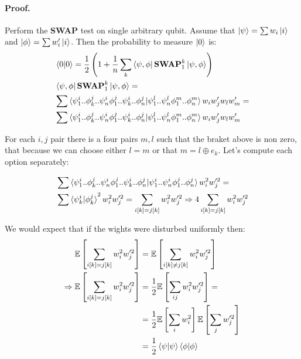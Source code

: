 \documentclass{article}
\begin{document}
\begin{multicols*}{2}
\paragraph{Proof.} Perform the \textbf{SWAP} test on single arbitrary qubit. Assume that \( \ket{\psi} = \sum{w_i \ket{i}} \) and \( \ket{\phi} = \sum{w^{\prime}_i \ket{i}} \). Then the probability to measure \( \ket{0} \) is:
\begin{equation*}
\begin{split}
& \braket{0|0} = \frac{1}{2}\left(1 +  \frac{1}{n}\sum_{k}{ \bra{\psi , \phi}\textbf{SWAP}^{k}_{1} \ket{\psi, \phi}}   \right)  \\ 
& \bra{\psi , \phi}\textbf{SWAP}^{k}_{1} \ket{\psi, \phi} = \\& \sum{\braket{\psi^{i}_{1}..\phi^{j}_{k}..\psi^{i}_{n}\phi^{j}_{1}..\psi^{i}_{k}..\phi^{j}_{n}|\psi^{l}_{1}..\psi^{l}_{n}\phi^{m}_{1}..\phi^{m}_{n}}w_{i}w^{\prime}_{j}w_{l}w^{\prime}_{m}} = \\& \sum{\braket{\psi^{i}_{1}..\phi^{j}_{k}..\psi^{i}_{n}\phi^{j}_{1}..\psi^{i}_{k}..\phi^{j}_{n}|\psi^{l}_{1}..\psi^{l}_{n}\phi^{m}_{1}..\phi^{m}_{n}}w_{i}w^{\prime}_{j}w_{l}w^{\prime}_{m}}
\end{split}    
\end{equation*}

For each \(i,j\) pair there is a four pairs \(m,l\) such that the braket above is non zero, that because we can choose either \( l = m \) or that \(m = l \oplus e_{k} \). Let's compute each option separately:

\begin{equation*}
    \begin{split} 
        & \sum{\braket{\psi^{i}_{1}..\phi^{j}_{k}..\psi^{i}_{n}\phi^{j}_{1}..\psi^{i}_{k}..\phi^{j}_{n}|\psi^{i}_{1}..\psi^{i}_{n}\phi^{j}_{1}..\phi^{j}_{n}}w^{2}_{i}w^{\prime 2 }_{j}} = \\ 
        & \sum{\braket{\psi^{i}_{k}|\phi^{j}_{k}}^2w^{2}_{i}w^{\prime 2 }_{j}} = \sum_{i[k]=j[k]}{w^{2}_{i}w^{\prime 2 }_{j}} \Rightarrow 4 \sum_{i[k]=j[k]}{w^{2}_{i}w^{\prime 2 }_{j}} 
    \end{split}
\end{equation*}

We would expect that if the wights were disturbed uniformly then: 
\begin{equation*}
    \begin{split}
        \mathbb{E}\left[\sum_{i[k]=j[k]}{w^{2}_{i}w^{\prime 2 }_{j}}\right] &= \mathbb{E}\left[\sum_{i[k] \neq j[k]}{w^{2}_{i}w^{\prime 2 }_{j}}\right] \\
        \Rightarrow \mathbb{E}\left[\sum_{i[k]=j[k]}{w^{2}_{i}w^{\prime 2 }_{j}}\right] &= \frac{1}{2} \mathbb{E}\left[\sum_{ij}{w^{2}_{i}w^{\prime 2 }_{j}}\right] = \\ &= \frac{1}{2}\mathbb{E}\left[\sum_{i}{w^{2}_{i}}\right]\mathbb{E}\left[\sum_{j}{w^{\prime 2}_{j}}\right]\\ 
        &= \frac{1}{2}\braket{\psi|\psi}\braket{\phi|\phi}
    \end{split}
\end{equation*}


\end{multicols*}
\end{document}
